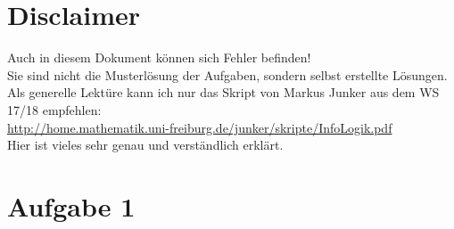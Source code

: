 \documentclass[a4paper]{scrartcl}
\begin{document}
\section*{Disclaimer}%
\label{sec:disclaimer}
Auch in diesem Dokument können sich Fehler befinden!\\
Sie sind nicht die Musterlösung der Aufgaben, sondern selbst erstellte Lösungen.\\

Als generelle Lektüre kann ich nur das Skript von Markus Junker aus dem WS 17/18 empfehlen:\\
\url{http://home.mathematik.uni-freiburg.de/junker/skripte/InfoLogik.pdf}\\
Hier ist vieles sehr genau und verständlich erklärt.

\section*{Aufgabe 1}%
\label{sec:aufgabe_1}
\end{document}
